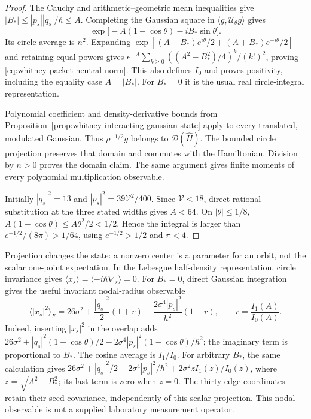\begin{proof}
The Cauchy and arithmetic--geometric mean inequalities give
\(|B_*|\leq|p_s||q_s|/\hbar\leq A\). Completing the Gaussian square
in \(\langle g,\mathcal U_\theta g\rangle\) gives
\[
 \exp\bigl[-A(1-\cos\theta)-iB_*\sin\theta\bigr].
\]
Its circle average is \(n^2\). Expanding
\(\exp[(A-B_*)e^{i\theta}/2+(A+B_*)e^{-i\theta}/2]\)
and retaining equal powers gives
\(e^{-A}\sum_{k\geq0}((A^2-B_*^2)/4)^k/(k!)^2\), proving
\eqref{eq:whitney-packet-neutral-norm}. This also defines \(I_0\)
and proves positivity, including the equality case \(A=|B_*|\).
For \(B_*=0\) it is the usual real circle-integral representation.

Polynomial coefficient and density-derivative bounds from
Proposition~\ref{prop:whitney-interacting-gaussian-state} apply to every
translated, modulated Gaussian. Thus \(\rho^{-1/2}g\) belongs to
\(\mathcal D(\widehat H)\). The bounded circle projection preserves
that domain and commutes with the Hamiltonian. Division by \(n>0\)
proves the domain claim. The same argument gives finite moments of every
polynomial multiplication observable.

Initially \(|q_s|^2=13\) and
\(|p_s|^2=39\mathcal V^2/400\). Since \(\mathcal V<18\), direct
rational substitution at the three stated widths gives \(A<64\).
On \(|\theta|\leq1/8\),
\(A(1-\cos\theta)\leq A\theta^2/2<1/2\). Hence the integral is
larger than \(e^{-1/2}/(8\pi)>1/64\), using
\(e^{-1/2}>1/2\) and \(\pi<4\).
\end{proof}

Projection changes the state: a nonzero center is a parameter for an orbit,
not the scalar one-point expectation. In the Lebesgue half-density representation, circle invariance gives
\(\langle x_s\rangle=\langle -i\hbar\nabla_s\rangle=0\).
For \(B_*=0\), direct Gaussian integration gives the useful invariant
nodal-radius observable
\begin{equation}
 \langle|x_s|^2\rangle_F
 =26\sigma^2+\frac{|q_s|^2}{2}(1+r)
       -\frac{2\sigma^4|p_s|^2}{\hbar^2}(1-r),
 \qquad r=\frac{I_1(A)}{I_0(A)}.
 \label{eq:whitney-packet-radius-moment}
\end{equation}
Indeed, inserting \(|x_s|^2\) in the overlap adds
\(26\sigma^2+|q_s|^2(1+\cos\theta)/2
-2\sigma^4|p_s|^2(1-\cos\theta)/\hbar^2\); the imaginary term
is proportional to \(B_*\). The cosine average is \(I_1/I_0\). For arbitrary \(B_*\), the same
calculation gives
\(26\sigma^2+|q_s|^2/2-2\sigma^4|p_s|^2/\hbar^2
+2\sigma^2zI_1(z)/I_0(z)\), where
\(z=\sqrt{A^2-B_*^2}\); its last term is zero when \(z=0\).
The thirty edge coordinates retain their seed covariance, independently
of this scalar projection. This nodal observable is not a supplied
laboratory measurement operator.

